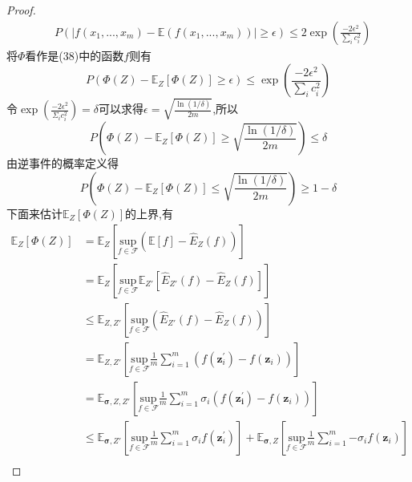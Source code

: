 \begin{proof}
{\begin{eqnarray}
&P\left( \left| f\left( x_1,...,x_m \right) -\mathbb{E}\left( f\left( x_1,...,x_m \right) \right) \right|\ge \epsilon \right) \le 2\exp \left( \frac{-2\epsilon ^2}{\sum\limits_i^{}{c_{i}^{2}}} \right)
\end{eqnarray}}
将$\varPhi$看作是(38)中的函数$f$则有
\begin{equation}
P\left(  \varPhi \left( Z \right) -\mathbb{E}_Z\left[ \varPhi \left( Z \right) \right] \ge \epsilon \right) \le \exp \left( \frac{-2\epsilon ^2}{\sum\limits_i^{}{c_{i}^{2}}} \right) \nonumber
\end{equation}
令$\exp \left( \frac{-2\epsilon ^2}{\varSigma _ic_{i}^{2}} \right) =\delta  $可以求得$\epsilon =\sqrt{\frac{\ln \left( 1/\delta \right)}{2m}}$,所以
\begin{equation}
P\left( \varPhi \left( Z \right) -\mathbb{E}_Z\left[ \varPhi \left( Z \right) \right] \ge \sqrt{\frac{\ln \left( 1/\delta \right)}{2m}} \right) \le \delta
\end{equation}
由逆事件的概率定义得
\begin{equation}
P\left( \varPhi \left( Z \right) -\mathbb{E}_Z\left[ \varPhi \left( Z \right) \right] \le \sqrt{\frac{\ln \left( 1/\delta \right)}{2m}} \right) \ge 1-\delta
\end{equation}
下面来估计$\mathbb{E}_Z\left[ \varPhi \left( Z \right) \right] $的上界,有
\begin{equation}
\begin{aligned}
\mathbb{E}_Z\left[ \varPhi \left( Z \right) \right] &=\mathbb{E}_Z\left[ \underset{f\in \mathcal{F}}{\text{sup}}\left( \mathbb{E}\left[ f \right] -\hat{E}_Z\left( f \right) \right) \right] \\
&=\mathbb{E}_Z\left[ \underset{f\in \mathcal{F}}{\text{sup}}\mathbb{E}_{Z'}\left[ \hat{E}_{Z'}\left( f \right) -\hat{E}_Z\left( f \right) \right] \right] \\
&\le \mathbb{E}_{Z,Z'}\left[ \underset{f\in \mathcal{F}}{\text{sup}}\left( \hat{E}_{Z'}\left( f \right) -\hat{E}_Z\left( f \right) \right) \right]\\
&=\mathbb{E}_{Z,Z'}\left[ \underset{f\in \mathcal{F}}{\text{sup}}\frac{1}{m}\sum_{i=1}^m{\left( f\left( \boldsymbol{z}_{i}^{'} \right) -f\left( \boldsymbol{z}_i \right) \right)} \right]\\
&= \mathbb{E}_{\boldsymbol{\sigma },Z,Z'}\left[ \underset{f\in \mathcal{F}}{\text{sup}}\frac{1}{m}\sum_{i=1}^m{\sigma _i\left( f\left( \boldsymbol{z_{i}^{'}} \right) -f\left( \boldsymbol{z}_i \right) \right)} \right]\\
&\le  \mathbb{E}_{\boldsymbol{\sigma},Z'}\left[ \underset{f\in \mathcal{F}}{\text{sup}}\frac{1}{m}\sum_{i=1}^m{\sigma _if\left( \boldsymbol{z}_{i}^{'} \right)} \right] +\mathbb{E}_{\boldsymbol{\sigma},Z}\left[ \underset{f\in \mathcal{F}}{\text{sup}}\frac{1}{m}\sum_{i=1}^m{-\sigma _if\left( \boldsymbol{z}_i \right)} \right]\\

\end{aligned}
\end{equation}
\end{proof}
